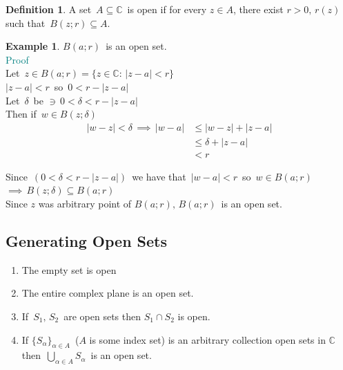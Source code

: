 \documentclass[11pt,a4paper]{article}
\theoremstyle{definition}
\newtheorem{definition}[thm]{Definition}
\newtheorem{example}[thm]{Example}
\begin{document}
\begin{definition}
A set $\, A \subseteq \mathbb{C}\,$ is open if for every $z \in A$, there exist $r>0,\, r(z)\,$ such that $\, B(z ; r )\subseteq A$.
\end{definition}

\begin{example}
$B(a ; r)\,$ is  an open set.\\


\textcolor{teal}{Proof}\\
Let $\, z \in B(a; r) = \big\{ z \in \mathbb{C}:\, \left|z -a\right| < r\big\}$\\

$\left|z - a\right| < r\,$ so $\, 0 < r - \left|z - a\right|$\\

Let $\, \delta\,$ be $\ni\, 0 < \delta < r - \left|z - a\right|$\\











Then if $\, w \in B(z; \delta)$
\begin{align*}
\left|w - z\right| < \delta \, \implies \, \left|w - a\right| & \leq \left|w - z\right| + \left|z - a\right|\\
& \leq  \delta + \left|z - a\right|\\
&< r
\end{align*}

Since $\, (0 < \delta < r - \left|z - a\right|)\,$ we have that $\,\left|w - a\right| < r\,$ so $\, w \in B(a;r)$\\

$\implies \, B(z; \delta) \subseteq B(a; r)$\\

Since $z$ was arbitrary point of $B(a;r),\, B(a;r)\,$ is an open set.
\end{example}

{\color[wave]{485}\subsection{Generating Open Sets}}
\begin{enumerate}
\item The empty set is open
\item The entire complex plane is an open set.
\item If $\, S_1, \, S_2\,$ are open sets then $S_1 \cap S_2$ is open.
\item If $\big\{S_{\alpha}\big\}_{\alpha \in A}\,$ ($A$ is some index set) is an arbitrary collection open sets in $\mathbb{C}$ then $\, \bigcup\limits_{\alpha \in A}S_{\alpha}\,$ is an open set.\\\\ 
\end{enumerate}
\end{document}
